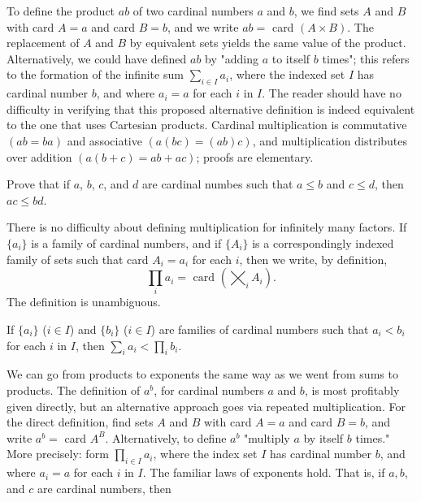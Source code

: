 To define the product $ab$ of two cardinal numbers $a$ and $b$, we find sets $A$ and $B$ with card $A = a$ and card $B = b$, and we write $ab =$ card $(A \times B)$. The replacement of $A$ and $B$ by equivalent sets yields the same value of the product. Alternatively, we could have defined $ab$ by "adding $a$ to itself $b$ times"; this refers to the formation of the infinite sum $\sum_{i \in I} a_{i}$, where the indexed set $I$ has cardinal number $b$, and where $a_{i} = a$ for each $i$ in $I$. The reader should have no difficulty in verifying that this proposed alternative definition is indeed equivalent to the one that uses Cartesian products. Cardinal multiplication is commutative $(ab = ba)$ and associative $(a(bc) = (ab)c)$, and multiplication distributes over addition $(a(b + c) = ab + ac)$; proofs are elementary. 

\begin{exercise} Prove that if $a$, $b$, $c$, and $d$ are cardinal numbes such that $a \le b$ and $c \le d$, then $ac \le bd$.
\end{exercise}

There is no difficulty about defining multiplication for infinitely many factors. If $\{ a_{i} \}$ is a family of cardinal numbers, and if $\{ A_{i} \}$ is a correspondingly indexed family of sets such that card $A_{i} = a_{i}$ for each $i$, then we write, by definition, 
\begin{equation*}
\prod_{i} a_{i} = \text{ card } ( \bigtimes_{i} A_{i} ).
\end{equation*}
The definition is unambiguous. 

\begin{exercise} If $\{ a_{i} \}$ ($i \in I$) and $\{ b_{i} \}$ ($i \in I$) are families of cardinal numbers such that $a_{i} < b_{i}$ for each $i$ in $I$, then $\sum_{i}a_{i} < \prod_{i}b_{i}$. 
\end{exercise}

We can go from products to exponents the same way as we went from sums to products. The definition of $a^{b}$, for cardinal numbers $a$ and $b$, is most profitably given directly, but an alternative approach goes via repeated multiplication. For the direct definition, find sets $A$ and $B$ with card $A = a$ and card $B = b$, and write $a^{b} =$ card $A^{B}$. Alternatively, to define $a^{b}$ "multiply $a$ by itself $b$ times." More precisely: form $\prod_{i \in I} a_{i}$, where the index set $I$ has cardinal number $b$, and where $a_{i} = a$ for each $i$ in $I$. The familiar laws of exponents hold. That is, if $a, b$, and $c$ are cardinal numbers, then 

